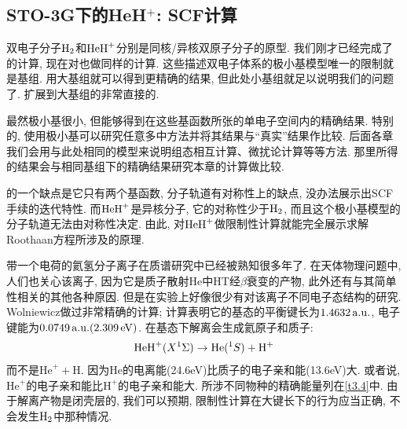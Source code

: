 \subsection{STO-3G下的HeH$^+$: SCF计算}
双电子分子$\mathrm{H}_2$和$\mathrm{HeH}^+$分别是同核/异核双原子分子的原型. 
我们刚才已经完成了的计算, 
现在对也做同样的计算. 
这些描述双电子体系的极小基模型唯一的限制就是基组. 
用大基组就可以得到更精确的结果, 
但此处小基组就足以说明我们的问题了. 
扩展到大基组的非常直接的. 


最然极小基很小, 
但能够得到在这些基函数所张的单电子空间内的精确结果. 
特别的, 
使用极小基可以研究任意多中方法并将其结果与``真实''结果作比较. 
后面各章我们会用与此处相同的模型来说明组态相互计算、微扰论计算等等方法. 
那里所得的结果会与相同基组下的精确结果研究本章的\hft 计算做比较.


的一个缺点是它只有两个基函数, 
分子轨道有对称性上的缺点, 没办法展示出SCF手续的迭代特性. 
而$\mathrm{HeH}^+$是异核分子, 它的对称性少于$\mathrm{H}_2$, 而且这个极小基模型的分子轨道无法由对称性决定. 
由此, 对$\mathrm{HeH}^+$做限制性\hft 计算就能完全展示求解Roothaan方程所涉及的原理. 

带一个电荷的氦氢分子离子在质谱研究中已经被熟知很多年了.
在天体物理问题中, 人们也关心该离子, 
因为它是质子散射$\mathrm{He}$中$\mathrm{HT}$经$\beta$衰变的产物,
此外还有与其简单性相关的其他各种原因. 
但是在实验上好像很少有对该离子不同电子态结构的研究.
Wolniewicz做过非常精确的计算; 计算表明它的基态的平衡键长为$1.4632\,\mathrm{a.u.}$, 电子键能为$0.0749\,\mathrm{a.u.}(2.309\,\mathrm{eV})$. 
在基态下解离会生成氦原子和质子:
\begin{align}
	\mathrm{HeH}^+(X^1\Sigma) \to \mathrm{He}(^1S) + \mathrm{H}^+
\end{align}
而不是$\mathrm{He}^+ + \mathrm{H}$. 
因为$\mathrm{He}$的电离能(24.6eV)比质子的电子亲和能(13.6eV)大. 
或者说, 
$\mathrm{He}^+$的电子亲和能比$\mathrm{H}^+$的电子亲和能大. 
所涉不同物种的精确能量列在\autoref{t3.4}中. 
由于解离产物是闭壳层的, 
我们可以预期, 
限制性\hft 计算在大键长下的行为应当正确, 
不会发生$\mathrm{H}_2$中那种情况. 

